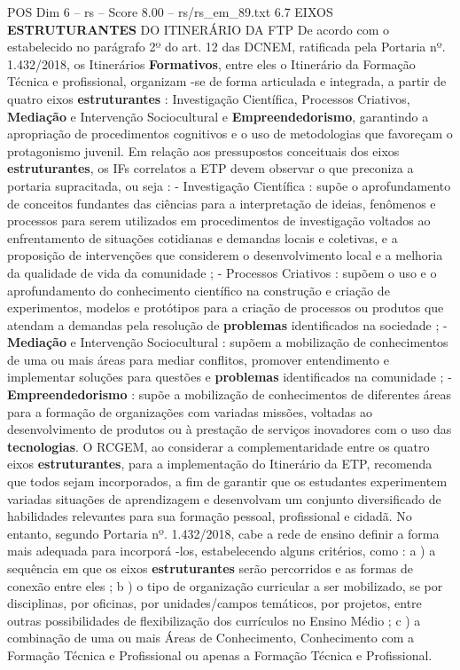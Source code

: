 \begin{textsample}{POS Dim 6 – rs – Score 8.00 – rs/rs\_em\_89.txt}  \label{ex:f6_pos_186}
6.7 EIXOS \textbf{ESTRUTURANTES} DO ITINERÁRIO DA FTP De acordo com o estabelecido no parágrafo 2º do art. 12 das DCNEM, ratificada pela Portaria nº. 1.432/2018, os Itinerários \textbf{Formativos}, entre eles o Itinerário da Formação Técnica e profissional, organizam -se de forma articulada e integrada, a partir de quatro eixos \textbf{estruturantes} : Investigação Científica, Processos Criativos, \textbf{Mediação} e Intervenção Sociocultural e \textbf{Empreendedorismo}, garantindo a apropriação de procedimentos cognitivos e o uso de metodologias que favoreçam o protagonismo juvenil.
Em relação aos pressupostos conceituais dos eixos \textbf{estruturantes}, os IFs correlatos a ETP devem observar o que preconiza a portaria supracitada, ou seja : - Investigação Científica : supõe o aprofundamento de conceitos fundantes das ciências para a interpretação de ideias, fenômenos e processos para serem utilizados em procedimentos de investigação voltados ao enfrentamento de situações cotidianas e demandas locais e coletivas, e a proposição de intervenções que considerem o desenvolvimento local e a melhoria da qualidade de vida da comunidade ; - Processos Criativos : supõem o uso e o aprofundamento do conhecimento científico na construção e criação de experimentos, modelos e protótipos para a criação de processos ou produtos que atendam a demandas pela resolução de \textbf{problemas} identificados na sociedade ; - \textbf{Mediação} e Intervenção Sociocultural : supõem a mobilização de conhecimentos de uma ou mais áreas para mediar conflitos, promover entendimento e implementar soluções para questões e \textbf{problemas} identificados na comunidade ; - \textbf{Empreendedorismo} : supõe a mobilização de conhecimentos de diferentes áreas para a formação de organizações com variadas missões, voltadas ao desenvolvimento de produtos ou à prestação de serviços inovadores com o uso das \textbf{tecnologias}.
O RCGEM, ao considerar a complementaridade entre os quatro eixos \textbf{estruturantes}, para a implementação do Itinerário da ETP, recomenda que todos sejam incorporados, a fim de garantir que os estudantes experimentem variadas situações de aprendizagem e desenvolvam um conjunto diversificado de habilidades relevantes para sua formação pessoal, profissional e cidadã.
No entanto, segundo Portaria nº. 1.432/2018, cabe a rede de ensino definir a forma mais adequada para incorporá -los, estabelecendo alguns critérios, como : a ) a sequência em que os eixos \textbf{estruturantes} serão percorridos e as formas de conexão entre eles ; b ) o tipo de organização curricular a ser mobilizado, se por disciplinas, por oficinas, por unidades/campos temáticos, por projetos, entre outras possibilidades de flexibilização dos currículos no Ensino Médio ; c ) a combinação de uma ou mais Áreas de Conhecimento, Conhecimento com a Formação Técnica e Profissional ou apenas a Formação Técnica e Profissional.

\end{textsample}
